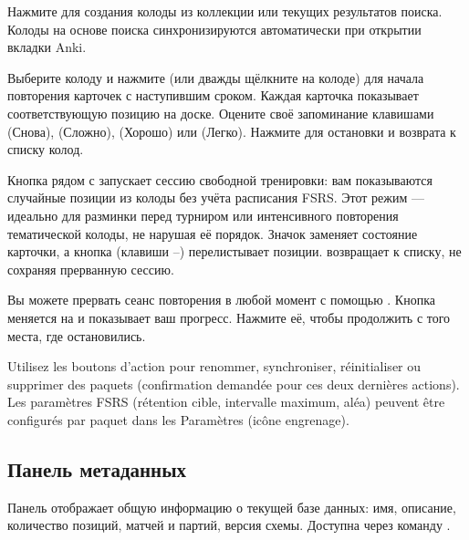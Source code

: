\documentclass[letterpaper,10pt,russian]{sphinxmanual}
\begin{document}
\sphinxAtStartPar
{} Нажмите  для создания колоды из коллекции или текущих результатов поиска. Колоды на основе поиска синхронизируются автоматически при открытии вкладки Anki.

\sphinxAtStartPar
{} Выберите колоду и нажмите  (или дважды щёлкните на колоде) для начала повторения карточек с наступившим сроком. Каждая карточка показывает соответствующую позицию на доске. Оцените своё запоминание клавишами  (Снова),  (Сложно),  (Хорошо) или  (Легко). Нажмите  для остановки и возврата к списку колод.

\sphinxAtStartPar
{} Кнопка  рядом с  запускает сессию свободной тренировки: вам показываются случайные позиции из колоды без учёта расписания FSRS. Этот режим  — идеально для разминки перед турниром или интенсивного повторения тематической колоды, не нарушая её порядок. Значок  заменяет состояние карточки, а кнопка  (клавиши –) перелистывает позиции.  возвращает к списку, не сохраняя прерванную сессию.

\sphinxAtStartPar
{} Вы можете прервать сеанс повторения в любой момент с помощью . Кнопка меняется на  и показывает ваш прогресс. Нажмите её, чтобы продолжить с того места, где остановились.

\sphinxAtStartPar
{} Utilisez les boutons d’action pour renommer,
synchroniser, réinitialiser ou supprimer des paquets (confirmation demandée
pour ces deux dernières actions). Les paramètres FSRS (rétention cible,
intervalle maximum, aléa) peuvent être configurés par paquet dans les
Paramètres (icône engrenage).


\subsection{Панель метаданных}
\label{\detokenize{manuel:panneau-metadonnees}}\label{\detokenize{manuel:panneau-metadata}}
\sphinxAtStartPar
Панель  отображает общую информацию о текущей базе данных: имя, описание, количество позиций, матчей и партий, версия схемы. Доступна через команду .
\end{document}
